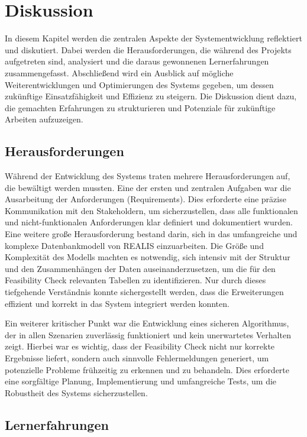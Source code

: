 \chapter{Diskussion}
In diesem Kapitel werden die zentralen Aspekte der Systementwicklung reflektiert und diskutiert. Dabei werden die Herausforderungen, die während des Projekts aufgetreten sind, analysiert und die daraus gewonnenen Lernerfahrungen zusammengefasst. Abschließend wird ein Ausblick auf mögliche Weiterentwicklungen und Optimierungen des Systems gegeben, um dessen zukünftige Einsatzfähigkeit und Effizienz zu steigern. Die Diskussion dient dazu, die gemachten Erfahrungen zu strukturieren und Potenziale für zukünftige Arbeiten aufzuzeigen.
\section{Herausforderungen}

Während der Entwicklung des Systems traten mehrere Herausforderungen auf, die bewältigt werden mussten. Eine der ersten und zentralen Aufgaben war die Ausarbeitung der Anforderungen (Requirements). Dies erforderte eine präzise Kommunikation mit den Stakeholdern, um sicherzustellen, dass alle funktionalen und nicht-funktionalen Anforderungen klar definiert und dokumentiert wurden. Eine weitere große Herausforderung bestand darin, sich in das umfangreiche und komplexe Datenbankmodell von \gls{REALIS} einzuarbeiten. Die Größe und Komplexität des Modells machten es notwendig, sich intensiv mit der Struktur und den Zusammenhängen der Daten auseinanderzusetzen, um die für den Feasibility Check relevanten Tabellen zu identifizieren. Nur durch dieses tiefgehende Verständnis konnte sichergestellt werden, dass die Erweiterungen effizient und korrekt in das System integriert werden konnten.

Ein weiterer kritischer Punkt war die Entwicklung eines sicheren Algorithmus, der in allen Szenarien zuverlässig funktioniert und kein unerwartetes Verhalten zeigt. Hierbei war es wichtig, dass der Feasibility Check nicht nur korrekte Ergebnisse liefert, sondern auch sinnvolle Fehlermeldungen generiert, um potenzielle Probleme frühzeitig zu erkennen und zu behandeln. Dies erforderte eine sorgfältige Planung, Implementierung und umfangreiche Tests, um die Robustheit des Systems sicherzustellen.

\section{Lernerfahrungen}

